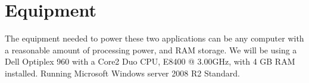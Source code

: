 \section{Equipment}
\label{sec:equipment}


The equipment needed to power these two applications can be any computer with a reasonable amount of processing power, and RAM storage. We will be using a Dell Optiplex 960 with a Core2 Duo CPU, E8400 @ 3.00GHz, with 4 GB RAM installed. Running Microsoft Windows server 2008 R2 Standard.

